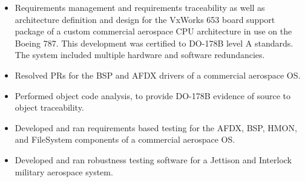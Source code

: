 \documentclass[print]{template/friggeri-cv} %
\begin{document}
\begin{entrylist}
{\begin{itemize}
\begin{itemize}
\item Requirements management and requirements traceability as well as architecture definition and design for the VxWorks 653 board support package of a custom commercial aerospace CPU architecture in use on the Boeing 787.  This development was certified to DO-178B level A standards.  The system included multiple hardware and software redundancies.
\item Resolved PRs for the BSP and AFDX drivers of a commercial aerospace OS.
\item Performed object code analysis, to provide DO-178B evidence of source to object traceability.
\item Developed and ran requirements based testing for the AFDX, BSP, HMON, and FileSystem components of a commercial aerospace OS.
\item Developed and ran robustness testing software for a Jettison and Interlock military aerospace system.
\end{itemize}
\end{itemize}}

\end{entrylist}

\newpage

\let\oldclearpage\clearpage
\renewcommand{\clearpage}{}
\let\clearpage\oldclearpage
\end{document}

